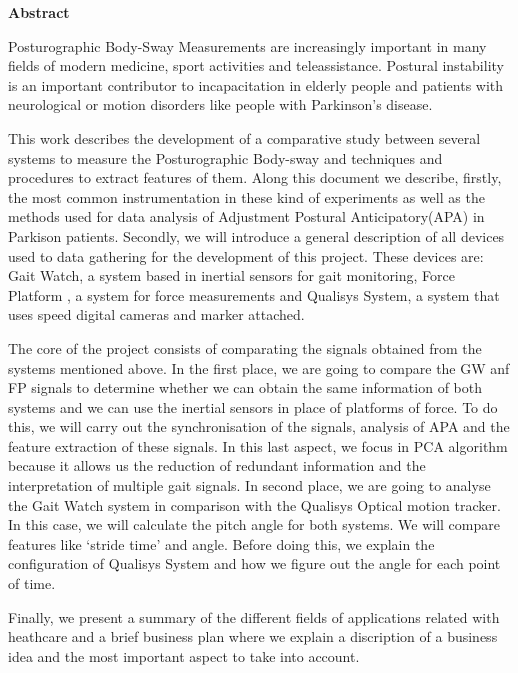 \begin{titlepage}
\label{ch:abstract}
{ \huge \bfseries Abstract \\[0.4cm] }

Posturographic Body-Sway Measurements are increasingly important in many fields of modern medicine, sport activities and teleassistance.  Postural instability is an important contributor to incapacitation in elderly people and patients with neurological or motion disorders like people with Parkinson’s disease.

This work describes the development  of a comparative study between several systems to measure the Posturographic Body-sway and techniques and procedures to extract features of them. Along this document we describe, firstly, the most common  instrumentation in these kind of experiments as well as the methods  used for data analysis of Adjustment Postural Anticipatory(APA) in Parkison patients. Secondly, we will introduce a general description of all devices used to data gathering  for the development of  this project. These devices are: Gait Watch, a system based in inertial sensors for gait monitoring, Force Platform , a system for force measurements and Qualisys System, a system that uses speed digital cameras and marker attached.

The core of the project consists of comparating the signals obtained from the systems mentioned above. In the first place, we are going to compare the GW anf FP signals to determine whether we can obtain the same information of both systems and we can use the inertial sensors in place of platforms of force. To do this, we will carry out the synchronisation of the signals, analysis of APA and the feature extraction of these signals. In this last aspect, we focus in PCA algorithm because it allows us the reduction of redundant information and the interpretation of multiple gait signals. In second place, we are going to analyse the Gait Watch system in comparison with the Qualisys Optical motion tracker. In this case, we will calculate the pitch angle for both systems. We will compare features like ‘stride time’ and angle. Before doing this, we explain  the configuration of Qualisys System and how we figure out the angle for each point of time.

Finally, we present a summary of the different fields of applications related with heathcare and a brief  business plan where we explain a discription of a business idea and the most important aspect to take into account.

\end{titlepage} 
